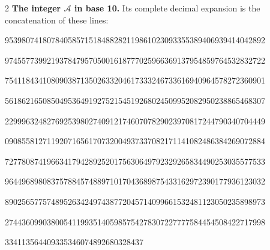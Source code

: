 \documentclass[10pt]{article}
\begin{document}
\begin{multicols}{2}
\textbf{The integer $\mathcal A$ in base 10.}
Its complete decimal expansion is the concatenation of these lines:\par
\begingroup\fontsize{7.7}{8.2}\selectfont{}\par
95398074180784058571518488282119861023093355389406939414042892\par
97455773992193784795705001618777025966369137954859764532832722\par
75411843410809038713502633204617333246733616940964578272360901\par
56186216508504953649192752154519268024509952082950238865468307\par
22999632482769253980274091217460707829023970817244790340704449\par
09085581271192071656170732004937337082171141082486384269072884\par
72778087419663417942892520175630649792329265834490253035577533\par
96449689808375788457488971017043689875433162972390177936123032\par
89025657757489526342497438772045714099661532481123050235898973\par
27443609903800541199351405985754278307227777584454508422717998\par
334113564409335346074892680328437\par
\endgroup
\end{multicols}
\end{document}
